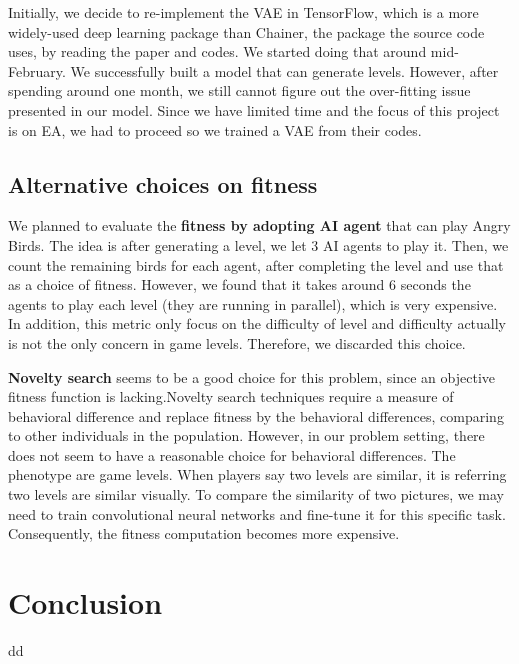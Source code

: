 \documentclass[manuscript,screen,review]{acmart}
\begin{document}
Initially, we decide to re-implement the VAE in TensorFlow, which is a more widely-used deep learning package than Chainer, the package the source code uses, by reading the paper and codes. We started doing that around mid-February. We successfully built a model that can generate levels. However, after spending around one month, we still cannot figure out the over-fitting issue presented in our model. Since we have limited time and the focus of this project is on EA, we had to proceed so we trained a VAE from their codes.

\subsection{Alternative choices on fitness}

We planned to evaluate the \textbf{fitness by adopting AI agent} that can play Angry Birds. The idea is after generating a level, we let 3 AI agents to play it. Then, we count the remaining birds for each agent, after completing the level and use that as a choice of fitness. However, we found that it takes around 6 seconds the agents to play each level (they are running in parallel), which is very expensive. In addition, this metric only focus on the difficulty of level and difficulty actually is not the only concern in game levels. Therefore, we discarded this choice.

\textbf{Novelty search} seems to be a good choice for this problem, since an objective fitness function is lacking.Novelty search techniques require a measure of behavioral difference and replace fitness by the behavioral differences, comparing to other individuals in the population. However, in our problem setting, there does not seem to have a reasonable choice for behavioral differences. The phenotype are game levels. When players say two levels are similar, it is referring two levels are similar visually. To compare the similarity of two pictures, we may need to train convolutional neural networks and fine-tune it for this specific task. Consequently, the fitness computation becomes more expensive.

\section{Conclusion}

dd
\end{document}
